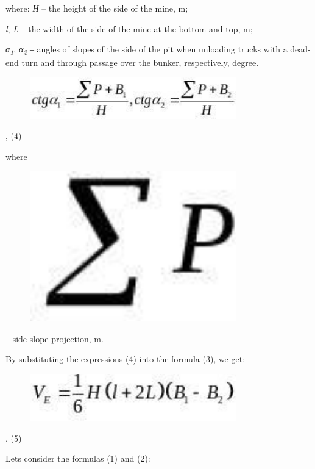 where: \emph{Н} -- the height of the side of the mine, m;

\emph{l}, \emph{L} -- the width of the side of the mine at the bottom
and top, m;

\emph{α\textsubscript{1}}, \emph{α\textsubscript{2}} ‒ angles of slopes
of the side of the pit when unloading trucks with a dead-end turn and
through passage over the bunker, respectively, degree.

\begin{figure}[H]
	\centering
	\includegraphics[width=0.8\textwidth]{assets/1356}
	\caption*{}
\end{figure}, (4)

where \begin{figure}[H]
	\centering
	\includegraphics[width=0.8\textwidth]{assets/1357}
	\caption*{}
\end{figure} ‒ side slope projection, m.

By substituting the expressions (4) into the formula (3), we get:

\begin{figure}[H]
	\centering
	\includegraphics[width=0.8\textwidth]{assets/1358}
	\caption*{}
\end{figure}. (5)

Let\textquotesingle s consider the formulas (1) and (2):

